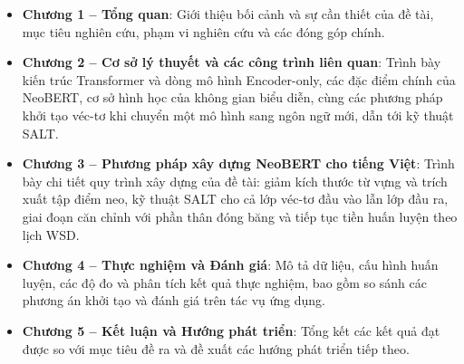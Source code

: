 \begin{itemize}
    \item \textbf{Chương 1 -- Tổng quan}: Giới thiệu bối cảnh và sự cần thiết của
    đề tài, mục tiêu nghiên cứu, phạm vi nghiên cứu và các đóng góp chính.

    \item \textbf{Chương 2 -- Cơ sở lý thuyết và các công trình liên quan}: Trình
    bày kiến trúc Transformer và dòng mô hình Encoder-only, các đặc điểm chính của
    NeoBERT, cơ sở hình học của không gian biểu diễn, cùng các phương pháp khởi tạo
    véc-tơ khi chuyển một mô hình sang ngôn ngữ mới, dẫn tới kỹ thuật SALT.

    \item \textbf{Chương 3 -- Phương pháp xây dựng NeoBERT cho tiếng Việt}: Trình bày
    chi tiết quy trình xây dựng của đề tài: giảm kích thước từ vựng và trích xuất tập
    điểm neo, kỹ thuật SALT cho cả lớp véc-tơ đầu vào lẫn lớp đầu ra, giai đoạn căn chỉnh với phần thân đóng băng và tiếp tục tiền huấn luyện theo lịch WSD.

    \item \textbf{Chương 4 -- Thực nghiệm và Đánh giá}: Mô tả dữ liệu, cấu hình
    huấn luyện, các độ đo và phân tích kết quả thực nghiệm, bao gồm so sánh các
    phương án khởi tạo và đánh giá trên tác vụ ứng dụng.

    \item \textbf{Chương 5 -- Kết luận và Hướng phát triển}: Tổng kết các kết quả
    đạt được so với mục tiêu đề ra và đề xuất các hướng phát triển tiếp theo.
\end{itemize}
